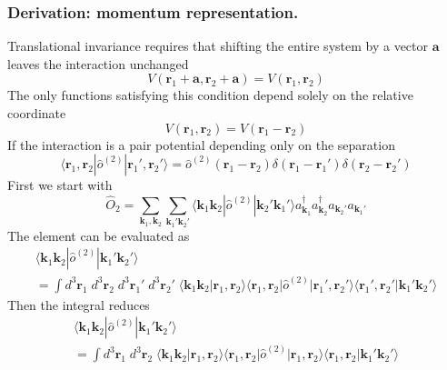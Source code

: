 \documentclass[../../../main.tex]{subfiles}
\begin{document}
\subsubsection{Derivation: momentum representation.}
Translational invariance requires that shifting the entire system by a vector $\mathbf{a}$ leaves the interaction unchanged
\begin{equation*}
  V(\mathbf{r}_1+\mathbf{a},\mathbf{r}_2+\mathbf{a})=
  V(\mathbf{r}_1,\mathbf{r}_2)
\end{equation*}
The only functions satisfying this condition depend solely on the relative coordinate
\begin{equation*}
  V(\mathbf{r}_1,\mathbf{r}_2)
  =   V(\mathbf{r}_1-\mathbf{r}_2)
\end{equation*}
If the interaction is a pair potential depending only on the separation
\begin{equation*}
  \langle \mathbf{r}_1,\mathbf{r}_2 | \hat{o}^{(2)} | \mathbf{r}_1', \mathbf{r}_2' \rangle
  = \hat{o}^{(2)}(\mathbf{r}_1 - \mathbf{r}_2) \delta(\mathbf{r}_1 - \mathbf{r}_1') \delta(\mathbf{r}_2 - \mathbf{r}_2')
\end{equation*}
First we start with
\begin{equation*}
  \hat{O}_2 = \sum_{\mathbf{k}_1, \mathbf{k}_2} \sum_{\mathbf{k}_1' \mathbf{k}_2'}  \langle \mathbf{k}_1 \mathbf{k}_2 | \hat{o}^{(2)} | \mathbf{k}_2' \mathbf{k}_1' \rangle a ^\dagger _{\mathbf{k}_1} a ^\dagger _{\mathbf{k}_2 } a _{\mathbf{k}_2'} a _{\mathbf{k}_1'}
\end{equation*}
The element can be evaluated as
\begin{multline*}
  \langle \mathbf{k}_1 \mathbf{k}_2 | \hat{o}^{(2)} | \mathbf{k}_1' \mathbf{k}_2' \rangle \\
  = \int d^3 \mathbf{r}_1\; d^3 \mathbf{r}_2\; d^3 \mathbf{r}_{1}'\; d^3 \mathbf{r}_{2}'\; \langle \mathbf{k}_1 \mathbf{k}_2 | \mathbf{r}_1, \mathbf{r}_2 \rangle \langle \mathbf{r}_1, \mathbf{r}_2 | \hat{o}^{(2)} | \mathbf{r}_1', \mathbf{r}_2'\rangle\langle \mathbf{r}_1',\mathbf{r}_2' | \mathbf{k}_1' \mathbf{k}_2' \rangle
\end{multline*}
Then the integral reduces
\begin{multline*}
  \langle \mathbf{k}_1 \mathbf{k}_2 | \hat{o}^{(2)} | \mathbf{k}_1' \mathbf{k}_2' \rangle \\
  = \int d^3 \mathbf{r}_1\; d^3 \mathbf{r}_2\; \langle \mathbf{k}_1 \mathbf{k}_2 | \mathbf{r}_1, \mathbf{r}_2 \rangle \langle \mathbf{r}_1, \mathbf{r}_2 | \hat{o}^{(2)} | \mathbf{r}_1, \mathbf{r}_2\rangle\langle \mathbf{r}_1,\mathbf{r}_2 | \mathbf{k}_1' \mathbf{k}_2' \rangle
\end{multline*}
\end{document}
